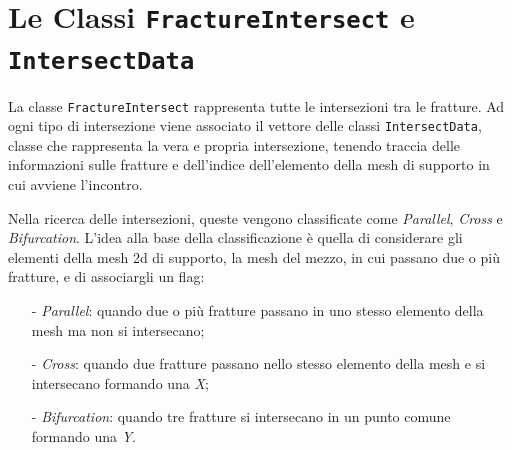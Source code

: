  \section{Le Classi \texttt{FractureIntersect} e \texttt{IntersectData}}

La classe \texttt{FractureIntersect} rappresenta tutte le intersezioni tra le fratture. Ad ogni tipo di intersezione viene associato il vettore delle classi \texttt{IntersectData}, classe che rappresenta la vera e propria intersezione, tenendo traccia delle informazioni sulle fratture e dell'indice dell'elemento della mesh di supporto in cui avviene l'incontro.
\par Nella ricerca delle intersezioni, queste vengono classificate come \textit{Parallel}, \textit{Cross} e \textit{Bifurcation}.  L'idea alla base della classificazione è quella di considerare gli elementi della mesh 2d di supporto, la mesh del mezzo, in cui passano due o più fratture, e di associargli un flag:
\begin{enumerate}
\item[-] \textit{Parallel}: quando due o più fratture passano in uno stesso elemento della mesh ma non si intersecano;
\item[-] \textit{Cross}: quando due fratture passano nello stesso elemento della mesh e si intersecano formando una \textit{X};
\item[-] \textit{Bifurcation}: quando tre fratture si intersecano in un punto comune formando una \textit{Y}.
\end{enumerate}

